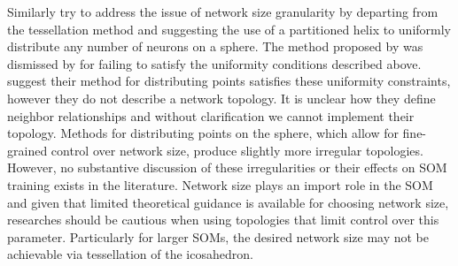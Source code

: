 Similarly \cite{Nishio:2006fk} try to address the issue of network size
granularity by departing from the tessellation method and suggesting the use
of a partitioned helix to uniformly distribute any number of neurons on a
sphere.  The method proposed by \cite{Rakhmanov94} was dismissed by
\cite{wu2005} for failing to satisfy the uniformity conditions described
above. \cite{Nishio:2006fk} suggest their method for distributing points
satisfies these uniformity constraints, however they do not describe a network
topology.  It is unclear how they define neighbor relationships and without
clarification we cannot implement their topology.  Methods for distributing
points on the sphere, which allow for fine-grained control over network size,
produce slightly more irregular topologies.  However, no substantive
discussion of these irregularities or their effects on SOM training exists in
the literature. Network size plays an import role in the SOM and given
that limited theoretical guidance is available for choosing network size,
researches should be cautious when using topologies that limit control over
this parameter.  Particularly for larger SOMs, the desired network size may
not be achievable via tessellation of the icosahedron.

